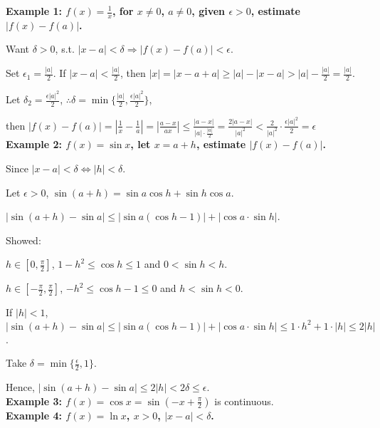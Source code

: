 \documentclass[12pt]{article}
\newcommand{\abs}[1]{\left| #1 \right|}
\theoremstyle{plain}
\begin{document}
    {\color{Brown}
    \textbf{Example 1:
    	$f(x)=\frac 1x$, for $x\neq 0$, $a\neq 0$, given $\epsilon > 0$,
        estimate $\abs{f(x)-f(a)}$.}

    Want $\delta >0$, s.t. $\abs{x-a}<\delta \Rightarrow \abs{f(x)-f(a)}<\epsilon$.
    
    Set $\epsilon_1 = \frac{\abs{a}}{2}$. If $\abs{x-a}<\frac{\abs a}2$, then
    $\abs{x} =\abs{x-a+a}\geq \abs a-\abs{x-a}> \abs{a}-\frac{\abs a}2 =\frac{\abs a}2$.

    Let $\delta_2 = \frac{\epsilon \abs{a}^2}{2}$, $\therefore 
    \delta = \min \{\frac{\abs a}2, \frac{\epsilon \abs{a}^2}2\}$,
  
    then $\abs{f(x)-f(a)}=\abs{\frac1x -\frac1a}
    =\abs{\frac{a-x}{ax}}\leq \frac{\abs{a-x}}{\abs a\cdot \frac{\abs a}2}
    =\frac{2\abs{a-x}}{\abs{a}^2}
    <\frac{2}{\abs a^2}\cdot \frac{\epsilon\abs{a}^2}{2}=\epsilon$\\


    \textbf{Example 2:
    $f(x) =\sin x$, let $x=a+h$, estimate $\abs{f(x)-f(a)}$.}

    Since $\abs{x-a}<\delta \iff \abs h< \delta$.

    Let $\epsilon > 0$, 
    $\sin (a+h)=\sin a \cos h+\sin h\cos a$. 

    $\abs{\sin (a+h)-\sin a}\leq \abs{\sin a(\cos h-1)}
    +\abs{\cos a\cdot \sin h}$.

    Showed:
    \begin{description}
        \item  $h\in [0,\frac{\pi}2]$, $1-h^2\leq \cos h\leq 1$ \quad and \quad
            $0<\sin h<h$. 
        \item  $h\in[-\frac{\pi}2, \frac{\pi}2]$, $-h^2\leq \cos h-1\leq 0$ 
        \quad and \quad $h<\sin h<0$.
    \end{description}

    If $\abs h<1$, 
    $\abs{\sin (a+h)-\sin a}\leq \abs{\sin a(\cos h-1)}
    +\abs{\cos a\cdot \sin h}\leq 1\cdot h^2 +1\cdot\abs{h}\leq 2\abs{h}$.

    Take $\delta = \min \{\frac{\epsilon}2, 1\}$.

    Hence, $\abs{\sin (a+h)-\sin a}\leq 2\abs{h}<2\delta\leq \epsilon$.\\


    \textbf{Example 3: 
        $f(x) =\cos x=\sin (-x +\frac{\pi}2)$} is continuous. \\


    \textbf{Example 4: 
        $f(x) = \ln x$, $x>0$, $\abs{x-a}<\delta$.}

}
\end{document}
